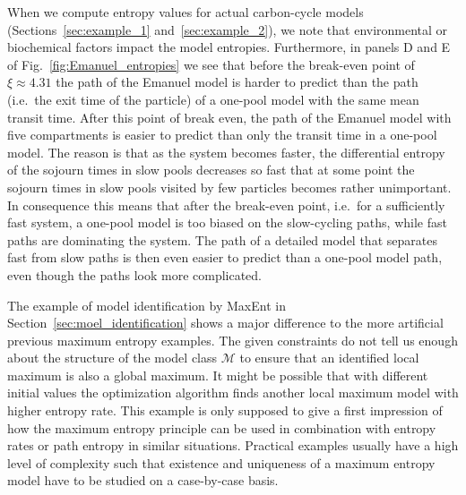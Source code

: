 \documentclass[smallextended]{svjour3}
\newcommand{\ie}{i.e.}
\begin{document}
When we compute entropy values for actual carbon-cycle models (Sections~\ref{sec:example_1} and~\ref{sec:example_2}), we note that environmental or biochemical factors impact the model entropies.
Furthermore, in panels D and E of Fig.~\ref{fig:Emanuel_entropies} we see that before the break-even point of $\xi\approx4.31$ the path of the Emanuel model is harder to predict than the path (\ie\ the exit time of the particle) of a one-pool model with the same mean transit time.
After this point of break even, the path of the Emanuel model with five compartments is easier to predict than only the transit time in a one-pool model.
The reason is that as the system becomes faster, the differential entropy of the sojourn times in slow pools decreases so fast that at some point the sojourn times in slow pools visited by few particles becomes rather unimportant.
In consequence this means that after the break-even point, \ie\ for a sufficiently fast system, a one-pool model is too biased on the slow-cycling paths, while fast paths are dominating the system.
The path of a detailed model that separates fast from slow paths is then even easier to predict than a one-pool model path, even though the paths look more complicated.

The example of model identification by MaxEnt in Section~\ref{sec:moel_identification} shows a major difference to the more artificial previous maximum entropy examples.
The given constraints do not tell us enough about the structure of the model class $\mathcal{M}$ to ensure that an identified local maximum is also a global maximum.
It might be possible that with different initial values the optimization algorithm finds another local maximum model with higher entropy rate.
This example is only supposed to give a first impression of how the maximum entropy principle can be used in combination with entropy rates or path entropy in similar situations.
Practical examples usually have a high level of complexity such that existence and uniqueness of a maximum entropy model have to be studied on a case-by-case basis.
\end{document}
